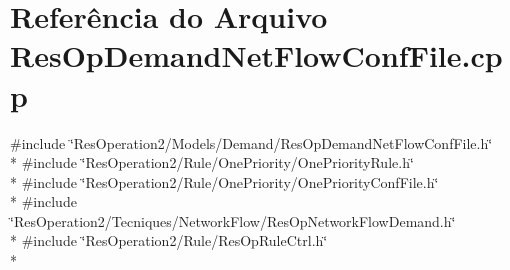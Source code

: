 \section{Referência do Arquivo Res\+Op\+Demand\+Net\+Flow\+Conf\+File.\+cpp}
\label{_res_op_demand_net_flow_conf_file_8cpp}
{\ttfamily \#include \char`\"{}Res\+Operation2/\+Models/\+Demand/\+Res\+Op\+Demand\+Net\+Flow\+Conf\+File.\+h\char`\"{}}\\*
{\ttfamily \#include \char`\"{}Res\+Operation2/\+Rule/\+One\+Priority/\+One\+Priority\+Rule.\+h\char`\"{}}\\*
{\ttfamily \#include \char`\"{}Res\+Operation2/\+Rule/\+One\+Priority/\+One\+Priority\+Conf\+File.\+h\char`\"{}}\\*
{\ttfamily \#include \char`\"{}Res\+Operation2/\+Tecniques/\+Network\+Flow/\+Res\+Op\+Network\+Flow\+Demand.\+h\char`\"{}}\\*
{\ttfamily \#include \char`\"{}Res\+Operation2/\+Rule/\+Res\+Op\+Rule\+Ctrl.\+h\char`\"{}}\\*
